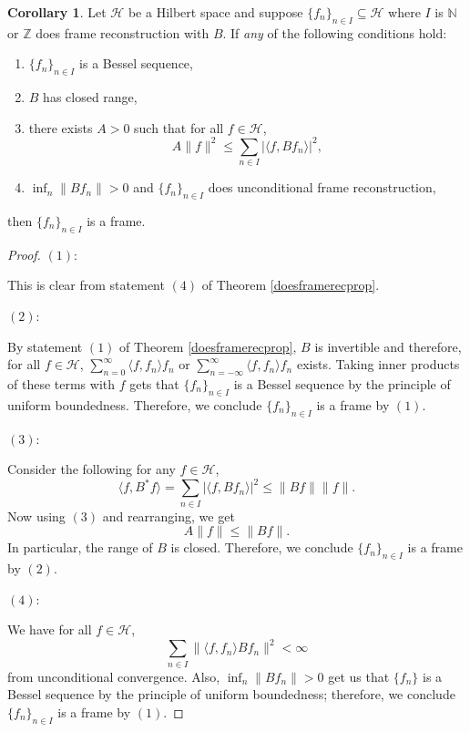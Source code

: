 \documentclass[11pt]{amsart}
\theoremstyle{definition}
\newtheorem{cor}{Corollary}[section]
\numberwithin{equation}{section}
\newcommand{\Hcal}{\mathcal{H}} %
\begin{document}
\begin{cor}\label{almostframecor}
Let $\Hcal$ be a Hilbert space and suppose $\{f_{n}\}_{n\in I}\subseteq \Hcal$ where $I$ is $\mathbb{N}$ or $\mathbb{Z}$ does frame reconstruction with $B$. If \emph{any} of the following conditions hold:
\begin{enumerate}
\item $\{f_n\}_{n\in I}$ is a Bessel sequence,
\item \(B\) has closed range,
\item there exists $A>0$ such that for all $f\in \Hcal$,
    \[
    A\|f\|^2 \leq \sum_{n\in I} |\langle f, Bf_n \rangle|^2,
    \]
\item \(\inf_n \|B f_n\| > 0\) and $\{f_n\}_{n\in I}$ does unconditional frame reconstruction,
\end{enumerate}
then $\{f_n\}_{n\in I}$ is a frame.
\end{cor}
\begin{proof}
$(1)$: 

This is clear from statement $(4)$ of Theorem \ref{doesframerecprop}.

$(2)$:

By statement $(1)$ of Theorem \ref{doesframerecprop}, $B$ is invertible and therefore, for all $f\in \Hcal$,
$\sum_{n=0}^{\infty}\langle f,f_{n}\rangle f_{n}$ or $\sum_{n=-\infty}^{\infty}\langle f,f_{n}\rangle f_{n}$ exists. Taking inner products of these terms with $f$ gets that $\{f_n\}_{n\in I}$ is a Bessel sequence by the principle of uniform boundedness. Therefore, we conclude $\{f_n\}_{n\in I}$ is a frame by $(1)$.

$(3):$

Consider the following for any $f\in \Hcal$,
$$\langle f, B^{*}f\rangle =\sum_{n\in I}|\langle f, Bf_{n}\rangle|^{2}\leq \|Bf\| \|f\|.$$  Now using $(3)$ and rearranging, we get
$$A\|f\|\leq \|Bf\|.$$ In particular, the range of $B$ is closed. Therefore, we conclude $\{f_n\}_{n\in I}$ is a frame by $(2)$.

$(4):$

We have for all $f\in \Hcal$, $$\sum_{n\in I}\|\langle f, f_n \rangle B f_n\|^{2}<\infty$$ from unconditional convergence. Also, \(\inf_n \|B f_n\| > 0\) get us that $\{f_{n}\}$ is a Bessel sequence by the principle of uniform boundedness; therefore, we conclude $\{f_n\}_{n\in I}$ is a frame by $(1)$.
\end{proof}
\end{document}
